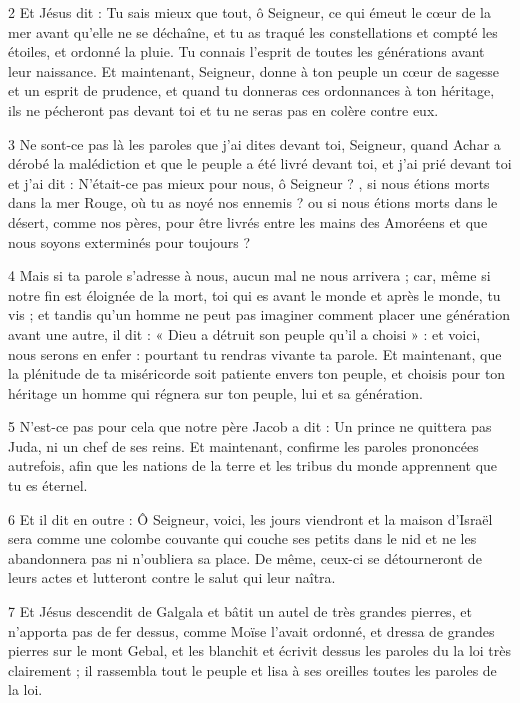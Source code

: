 \par 2 Et Jésus dit : Tu sais mieux que tout, ô Seigneur, ce qui émeut le cœur de la mer avant qu'elle ne se déchaîne, et tu as traqué les constellations et compté les étoiles, et ordonné la pluie. Tu connais l'esprit de toutes les générations avant leur naissance. Et maintenant, Seigneur, donne à ton peuple un cœur de sagesse et un esprit de prudence, et quand tu donneras ces ordonnances à ton héritage, ils ne pécheront pas devant toi et tu ne seras pas en colère contre eux.

\par 3 Ne sont-ce pas là les paroles que j'ai dites devant toi, Seigneur, quand Achar a dérobé la malédiction et que le peuple a été livré devant toi, et j'ai prié devant toi et j'ai dit : N'était-ce pas mieux pour nous, ô Seigneur ? , si nous étions morts dans la mer Rouge, où tu as noyé nos ennemis ? ou si nous étions morts dans le désert, comme nos pères, pour être livrés entre les mains des Amoréens et que nous soyons exterminés pour toujours ?

\par 4 Mais si ta parole s'adresse à nous, aucun mal ne nous arrivera ; car, même si notre fin est éloignée de la mort, toi qui es avant le monde et après le monde, tu vis ; et tandis qu'un homme ne peut pas imaginer comment placer une génération avant une autre, il dit : « Dieu a détruit son peuple qu'il a choisi » : et voici, nous serons en enfer : pourtant tu rendras vivante ta parole. Et maintenant, que la plénitude de ta miséricorde soit patiente envers ton peuple, et choisis pour ton héritage un homme qui régnera sur ton peuple, lui et sa génération.

\par 5 N'est-ce pas pour cela que notre père Jacob a dit : Un prince ne quittera pas Juda, ni un chef de ses reins. Et maintenant, confirme les paroles prononcées autrefois, afin que les nations de la terre et les tribus du monde apprennent que tu es éternel.

\par 6 Et il dit en outre : Ô Seigneur, voici, les jours viendront et la maison d'Israël sera comme une colombe couvante qui couche ses petits dans le nid et ne les abandonnera pas ni n'oubliera sa place. De même, ceux-ci se détourneront de leurs actes et lutteront contre le salut qui leur naîtra.

\par 7 Et Jésus descendit de Galgala et bâtit un autel de très grandes pierres, et n'apporta pas de fer dessus, comme Moïse l'avait ordonné, et dressa de grandes pierres sur le mont Gebal, et les blanchit et écrivit dessus les paroles du la loi très clairement ; il rassembla tout le peuple et lisa à ses oreilles toutes les paroles de la loi.

